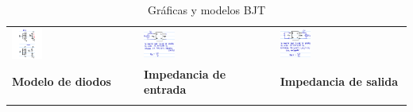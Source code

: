 \documentclass[11pt]{article}
\begin{document}
\begin{table}
\begin{tabular}{|p{}|p{}|p{}|}
			\includegraphics[width=0.25\textwidth, keepaspectratio]{diodes}
			& \includegraphics[width=0.25\textwidth, keepaspectratio]{input-impedance}
			& \includegraphics[width=0.25\textwidth, keepaspectratio]{output-impedance} \\
			\textbf{Modelo de diodos} & \textbf{Impedancia de entrada} & \textbf{Impedancia de salida} \\
			&\\
			\hline
		\end{tabular}
		\caption{Gráficas y modelos BJT}
	\end{table}
\end{document}
